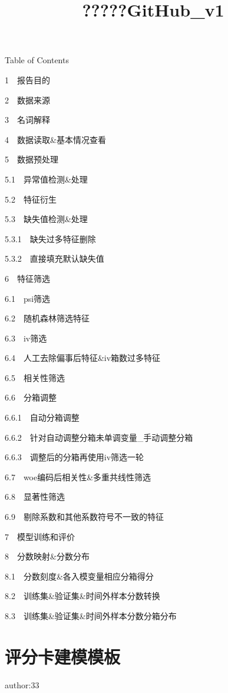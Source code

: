 \documentclass[11pt]{article}
\title{?????GitHub\_v1}
\begin{document}
    
    
    \maketitle
    
    

    
    Table of Contents{}

{{1~~}报告目的}

{{2~~}数据来源}

{{3~~}名词解释}

{{4~~}数据读取\&基本情况查看}

{{5~~}数据预处理}

{{5.1~~}异常值检测\&处理}

{{5.2~~}特征衍生}

{{5.3~~}缺失值检测\&处理}

{{5.3.1~~}缺失过多特征删除}

{{5.3.2~~}直接填充默认缺失值}

{{6~~}特征筛选}

{{6.1~~}psi筛选}

{{6.2~~}随机森林筛选特征}

{{6.3~~}iv筛选}

{{6.4~~}人工去除偏事后特征\&iv箱数过多特征}

{{6.5~~}相关性筛选}

{{6.6~~}分箱调整}

{{6.6.1~~}自动分箱调整}

{{6.6.2~~}针对自动调整分箱未单调变量\_手动调整分箱}

{{6.6.3~~}调整后的分箱再使用iv筛选一轮}

{{6.7~~}woe编码后相关性\&多重共线性筛选}

{{6.8~~}显著性筛选}

{{6.9~~}剔除系数和其他系数符号不一致的特征}

{{7~~}模型训练和评价}

{{8~~}分数映射\&分数分布}

{{8.1~~}分数刻度\&各入模变量相应分箱得分}

{{8.2~~}训练集\&验证集\&时间外样本分数转换}

{{8.3~~}训练集\&验证集\&时间外样本分数分箱分布}

    \section{评分卡建模模板}\label{ux8bc4ux5206ux5361ux5efaux6a21ux6a21ux677f}

    author:33
\end{document}
